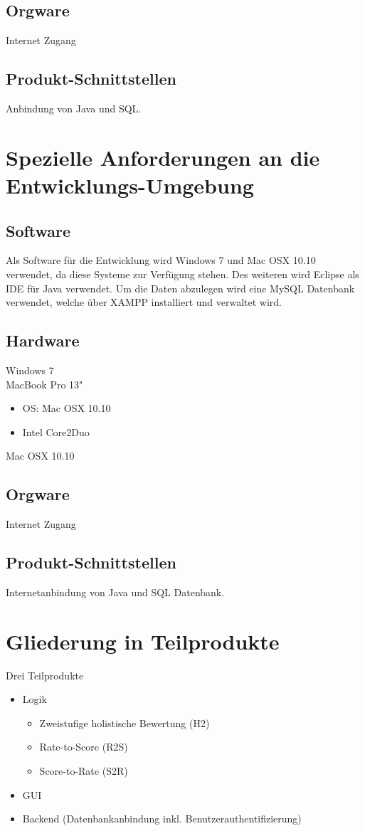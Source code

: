 \documentclass[a4paper,listof=leveldown,listof=numbered]{scrreprt}
\begin{document}
	\section{Orgware}
	Internet Zugang
	
	\section{Produkt-Schnittstellen}
	Anbindung von Java und SQL.
	
\chapter{Spezielle Anforderungen an die Entwicklungs-Umgebung}
	
	\section{Software}
	Als Software für die Entwicklung wird Windows 7 und Mac OSX 10.10 verwendet, da diese Systeme zur Verfügung stehen. Des weiteren wird Eclipse als IDE für Java verwendet. Um die Daten abzulegen wird eine MySQL Datenbank verwendet, welche über XAMPP installiert und verwaltet wird.
	\section{Hardware}
	Windows 7\\
	
	MacBook Pro 13"
	\begin{itemize}
		\item OS: Mac OSX 10.10
		\item Intel Core2Duo
	\end{itemize}
	Mac OSX 10.10
	
	\section{Orgware}
	Internet Zugang
	
	\section{Produkt-Schnittstellen}
	Internetanbindung von Java und SQL Datenbank.

	
\chapter{Gliederung in Teilprodukte}
	Drei Teilprodukte
	\begin{itemize}
		\item Logik 
			\begin{itemize}
				\item Zweistufige holistische Bewertung (H2)
				\item Rate-to-Score (R2S)
				\item Score-to-Rate (S2R)
			\end{itemize}
		\item GUI
		\item Backend (Datenbankanbindung inkl. Benutzerauthentifizierung)
	\end{itemize}
\end{document}
